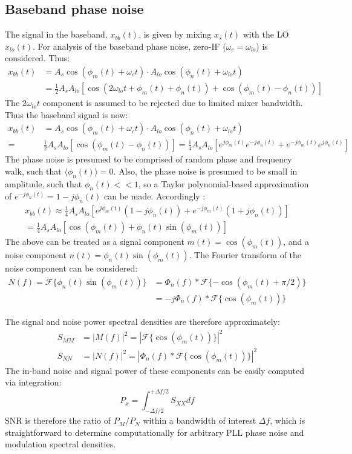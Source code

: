 	\subsection{Baseband phase noise}
		The signal in the baseband, $x_{bb}(t)$, is given by mixing $x_{s}(t)$ with the LO $x_{lo}(t)$. For analysis of the baseband phase noise, zero-IF ($\omega_{c}=\omega_{lo}$) is considered. Thus:
		\begin{align}
			x_{bb}(t) & = A_s\cos(\phi_m(t)+\omega_ct)\cdot A_{lo}\cos(\phi_n(t)+\omega_{lo}t) \\
			& = \frac{1}{2}A_sA_{lo}\left[\cos(2\omega_{lo}t + \phi_m(t) + \phi_n(t)) +  \cos(\phi_m(t) - \phi_n(t))\right] 
		\end{align} 
		The $2\omega_{lo}t$ component is assumed to be rejected due to limited mixer bandwidth. Thus the baseband signal is now:
		\begin{align}
			x_{bb}(t) &= A_s\cos(\phi_m(t)+\omega_ct)\cdot A_{lo}\cos(\phi_n(t)+\omega_{lo}t)\\
			= & \frac{1}{2}A_sA_{lo}\left[\cos(\phi_m(t) - \phi_n(t))\right] = \frac{1}{4}A_sA_{lo}\left[e^{j\phi_m(t)} e^{-j\phi_n(t)} + e^{-j\phi_m(t)} e^{j\phi_n(t)}\right] 
		\end{align} 
		The phase noise is presumed to be comprised of random phase and frequency walk, such that $\langle\phi_n(t)\rangle = 0$. Also, the phase noise is presumed to be small in amplitude, such that $\phi_n(t) << 1$, so a Taylor polynomial-based approximation of $e^{-j\phi_n(t)} = 1 -j\phi_n(t)$ can be made. Accordingly :
		\begin{align}
			x_{bb}(t) \approx \frac{1}{4}A_sA_{lo}\left[e^{j\phi_m(t)}(1 -j\phi_n(t))+ e^{-j\phi_m(t)}(1+j\phi_n(t))\right] \\
			= \frac{1}{4}A_sA_{lo}\left[\cos(\phi_m(t)) + \phi_n(t)\sin(\phi_m(t))\right]
		\end{align} 
		The above can be treated as a signal component $m(t) = \cos(\phi_m(t))$, and a noise component $n(t) = \phi_n(t)\sin(\phi_m(t))$. The Fourier transform of the noise component can be considered:
		\begin{align}
			N(f) = \mathcal{F}\{\phi_n(t)\sin(\phi_m(t))\} &= \Phi_n(f)*\mathcal{F}\{-\cos(\phi_m(t)+\pi/2)\}\\
			& =-j\Phi_n(f)*\mathcal{F}\{\cos(\phi_m(t))\}
		\end{align}

		The signal and noise power spectral densities are therefore approximately:
		\begin{align}
			S_{MM} &= |M(f)|^2 = |\mathcal{F}\{\cos(\phi_m(t))\}|^2\\
			S_{NN} &= |N(f)|^2 = |\Phi_n(f)*\mathcal{F}\{\cos(\phi_m(t))\}|^2
		\end{align}
		The in-band noise and signal power of these components can be easily computed via integration:
		\begin{equation}
			P_x = \int^{+\Delta f/2}_{-\Delta f/2}S_{XX}df
		\end{equation}
		SNR is therefore the ratio of $P_M/P_N$ within a bandwidth of interest $\Delta f$, which is straightforward to determine computationally for arbitrary PLL phase noise and modulation spectral densities.